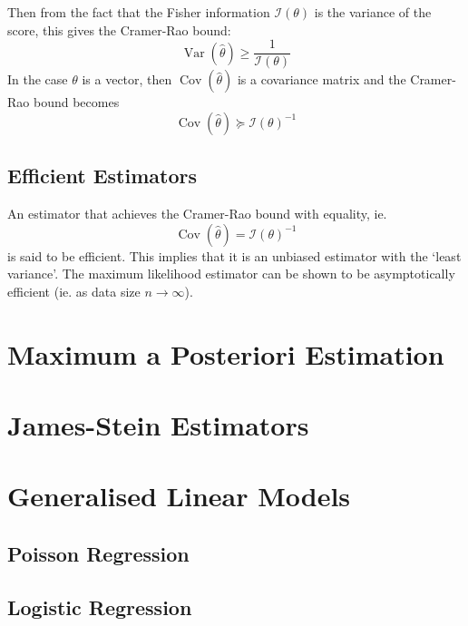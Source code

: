 \documentclass[11pt]{report} %
\begin{document}
Then from the fact that the Fisher information $\mathcal{I}\left(\theta\right)$ is the variance of the score, this gives the Cramer-Rao bound:
\begin{equation}
\operatorname{Var}\left(\hat{\theta}\right) \geq \dfrac{1}{\mathcal{I}\left(\theta\right)}
\end{equation}
In the case $\theta$ is a vector, then $\operatorname{Cov}\left(\hat{\theta}\right)$ is a covariance matrix and the Cramer-Rao bound becomes
\begin{equation}
\operatorname{Cov}\left(\hat{\theta}\right) \succeq \mathcal{I}\left(\theta\right)^{-1}
\end{equation}

\subsection{Efficient Estimators}

An estimator that achieves the Cramer-Rao bound with equality, ie.
\begin{equation}
\operatorname{Cov}\left(\hat{\theta}\right) = \mathcal{I}\left(\theta\right)^{-1}
\end{equation}
is said to be efficient. This implies that it is an unbiased estimator with the `least variance'. The maximum likelihood estimator can be shown to be asymptotically efficient (ie. as data size $n \to \infty$).

\section{Maximum a Posteriori Estimation}

\section{James-Stein Estimators}

\section{Generalised Linear Models}

\subsection{Poisson Regression}

\subsection{Logistic Regression}
\end{document}

